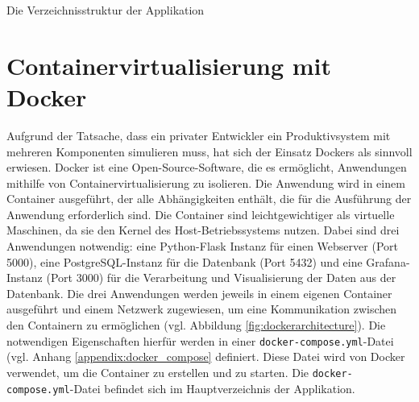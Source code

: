 \begin{marginfigure}
    \centering
    \begin{adjustbox}{width=\textwidth}
    \end{adjustbox}
    \caption{Die Verzeichnisstruktur der Applikation}
    \label{fig:dirstructure}
\end{marginfigure}

\section{Containervirtualisierung mit Docker}
Aufgrund der Tatsache, dass ein privater Entwickler ein Produktivsystem mit mehreren Komponenten simulieren muss, hat sich der Einsatz Dockers als sinnvoll erwiesen. Docker ist eine Open-Source-Software, die es ermöglicht, Anwendungen mithilfe von Containervirtualisierung zu isolieren. Die Anwendung wird in einem Container ausgeführt, der alle Abhängigkeiten enthält, die für die Ausführung der Anwendung erforderlich sind. Die Container sind leichtgewichtiger als virtuelle Maschinen, da sie den Kernel des Host-Betriebssystems nutzen. Dabei sind drei Anwendungen notwendig: eine Python-Flask Instanz für einen Webserver (Port 5000), eine PostgreSQL-Instanz für die Datenbank (Port 5432) und eine Grafana-Instanz (Port 3000) für die Verarbeitung und Visualisierung der Daten aus der Datenbank. Die drei Anwendungen werden jeweils in einem eigenen Container ausgeführt und einem Netzwerk zugewiesen, um eine Kommunikation zwischen den Containern zu ermöglichen (vgl. Abbildung \ref{fig:dockerarchitecture}). Die notwendigen Eigenschaften hierfür werden in einer \texttt{docker-compose.yml}-Datei (vgl. Anhang \ref{appendix:docker_compose} definiert. Diese Datei wird von Docker verwendet, um die Container zu erstellen und zu starten. Die \texttt{docker-compose.yml}-Datei befindet sich im Hauptverzeichnis der Applikation.

